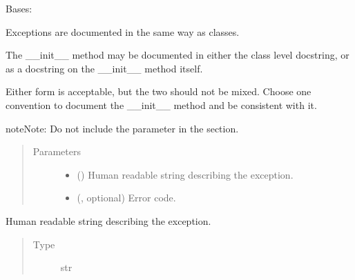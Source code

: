 \documentclass[letterpaper,10pt,english]{sphinxmanual}
\begin{document}
\begin{fulllineitems}
\label{\detokenize{source/example:example.ExampleError}}
\pysigstartsignatures
{}
\pysigstopsignatures
\sphinxAtStartPar
Bases: 

\sphinxAtStartPar
Exceptions are documented in the same way as classes.

\sphinxAtStartPar
The \_\_init\_\_ method may be documented in either the class level
docstring, or as a docstring on the \_\_init\_\_ method itself.

\sphinxAtStartPar
Either form is acceptable, but the two should not be mixed. Choose one
convention to document the \_\_init\_\_ method and be consistent with it.

\begin{sphinxadmonition}{note}{Note:}
\sphinxAtStartPar
Do not include the  parameter in the  section.
\end{sphinxadmonition}
\begin{quote}\begin{description}
\item[{Parameters}] \leavevmode\begin{itemize}
\item {} 
\sphinxAtStartPar
{} () \textendash{} Human readable string describing the exception.

\item {} 
\sphinxAtStartPar
{} (, optional) \textendash{} Error code.

\end{itemize}

\end{description}\end{quote}

\begin{fulllineitems}
\label{\detokenize{source/example:example.ExampleError.msg}}
\pysigstartsignatures
{}
\pysigstopsignatures
\sphinxAtStartPar
Human readable string describing the exception.
\begin{quote}\begin{description}
\item[{Type}] \leavevmode
\sphinxAtStartPar
str


\end{description}
\end{quote}
\end{fulllineitems}
\end{fulllineitems}
\end{document}
